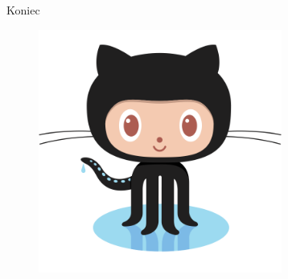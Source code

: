 \documentclass[9pt]{beamer}
\begin{document}

	\begin{frame}
	\Huge{\centerline{Koniec}}
			
		\begin{figure}
			\centering
			\includegraphics[height=8cm]{Octocat.png}
		\end{figure}
	
	\end{frame}

\end{document}
